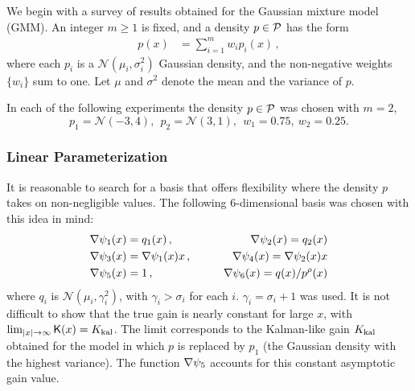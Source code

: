 We begin with a survey of results obtained for the Gaussian mixture model (GMM).  An integer $m\ge 1$ is fixed, and a density $p\in {\cal P}$ has the form
\begin{equation*}
\begin{aligned}
p(x)& = \sum_{i=1}^{m} w_{i} p_{i}(x) \,,
\end{aligned}
\end{equation*}
where each $p_{i}$ is a $\mathcal{N}(\mu_i,\sigma_i^2)$ Gaussian density, and the non-negative weights $\{w_i\}$ sum to one. Let $\mu$ and $\sigma^{2}$ denote the mean and the variance of $p$.
%
%
%

In each of the following experiments the density $p\in{\cal P}$ was chosen with $m=2$,
\[
p_1 = \mathcal{N}(-3, 4),\ \
p_2 = \mathcal{N}(3, 1),\ \
w_1 =0.75,\
w_2 =0.25.
\]

\subsubsection*{Linear Parameterization}

It is reasonable to search for a basis that offers flexibility where the density $p$ takes on non-negligible values.  The following $6$-dimensional basis was chosen with this idea in mind:
\begin{equation*}
\begin{aligned}
\nabla \psi_{1}(x) & = q_1(x)
\, ,\qquad
&\nabla \psi_{2}(x)  = q_2(x)
\\
\nabla \psi_{3}(x) & = \nabla \psi_{1}(x) x \, ,\qquad
&\nabla \psi_{4}(x)  = \nabla \psi_{2}(x) x \\
\nabla \psi_{5}(x) &= 1 \,  ,\qquad &\nabla \psi_{6}(x) =q(x)/p^{\rho}(x)
\end{aligned}
\end{equation*}
where $q_i$ is $\mathcal{N}(\mu_i,\gamma_i^2)$, with $\gamma_i>\sigma_i$ for each $i$. $\gamma_i=\sigma_i+1$ was used. It is not difficult to show that the true gain is nearly constant for large $x$, with $\lim_{|x|\to\infty} \text{\sf K}(x) = K_{\text{kal}}$. The limit corresponds to the Kalman-like gain $K_{\text{kal}}$ obtained for the model in which $p$ is replaced by $p_1$  (the Gaussian density with the highest variance). The function $\nabla \psi_{5}$ accounts for this constant asymptotic gain value.

